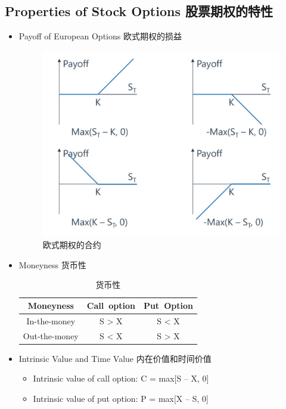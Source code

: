 \documentclass[a4paper,6pt,twoside,openany]{article}
\begin{document}
\subsection{Properties of Stock Options 股票期权的特性}
\begin{itemize}
\item Payoff of European Options 欧式期权的损益
  \begin{figure}[!htbp]
    \centering \includegraphics[width=150mm]{figures/Options_Payoff.jpg}
    \caption{欧式期权的合约}
  \end{figure}
\item Moneyness 货币性
  \begin{table}[!htb]
    \renewcommand\arraystretch{1.5}
    \caption{货币性}
    \centering
    \begin{tabular}{|c|c|c|} \hline
      \rowcolor[gray]{0.5}
     Moneyness & Call\ option &  Put\ Option\\ \hline
     In-the-money & S > X & S < X \\ \hline
     Out-the-money & S < X &  S > X \\ \hline 
    \end{tabular}
  \end{table}
\item Intrinsic Value and Time Value 内在价值和时间价值
  \begin{itemize}
  \item Intrinsic value of call option: C = max[S – X, 0]
  \item Intrinsic value of put option: P = max[X – S, 0]
  \end{itemize}

\end{itemize}
\end{document}
